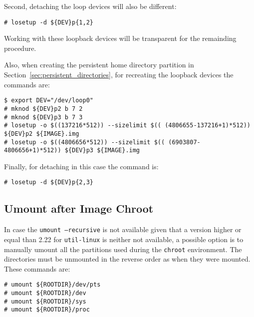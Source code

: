 Second, detaching the loop devices will also be different:

\begin{lstlisting}[]
# losetup -d ${DEV}p{1,2}
\end{lstlisting}
\FloatBarrier
\vspace{-5mm}

Working with these loopback devices will be transparent for the remainding
procedure.

Also, when creating the persistent home directory partition in
Section~\ref{sec:persistent_directories}, for recreating the loopback devices
the commands are:

\begin{lstlisting}[]
$ export DEV="/dev/loop0"
# mknod ${DEV}p2 b 7 2
# mknod ${DEV}p3 b 7 3
# losetup -o $((137216*512)) --sizelimit $(( (4806655-137216+1)*512)) ${DEV}p2 ${IMAGE}.img
# losetup -o $((4806656*512)) --sizelimit $(( (6903807-4806656+1)*512)) ${DEV}p3 ${IMAGE}.img
\end{lstlisting}
\FloatBarrier
\vspace{-5mm}

Finally, for detaching in this case the command is:
\begin{lstlisting}[]
# losetup -d ${DEV}p{2,3}
\end{lstlisting}
\FloatBarrier
\vspace{-5mm}


\subsection{Umount after Image Chroot}
\label{sec:umount}

In case the \texttt{umount --recursive} is not available given that a version
higher or equal than 2.22 for \texttt{util-linux} is neither not available,
a possible option is to manually umount all the partitions used during the
\texttt{chroot} environment. The directories must be unmounted in the reverse
order as when they were mounted. These commands are:

\begin{lstlisting}[]
# umount ${ROOTDIR}/dev/pts
# umount ${ROOTDIR}/dev
# umount ${ROOTDIR}/sys
# umount ${ROOTDIR}/proc
\end{lstlisting}
\FloatBarrier
\vspace{-5mm}